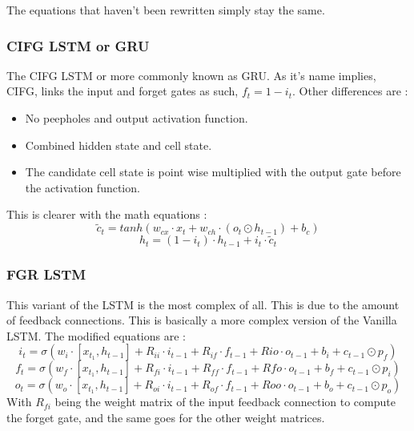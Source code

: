 The equations that haven't been rewritten simply stay the same.

\subsubsection{\acf{CIFG} \ac{LSTM} or \acf{GRU}}
The \ac{CIFG} \ac{LSTM} or more commonly known as \ac{GRU}. \cite{gru,gruKeras,gruPyTorch} As it's name implies, \acl{CIFG}, links the input and forget gates as such, $f_t=1-i_t$. Other differences are :
\begin{itemize}
  \item No peepholes and output activation function.
  \item Combined hidden state and cell state.
  \item The candidate cell state is point wise multiplied with the output gate before the activation function.
\end{itemize}

This is clearer with the math equations :
\begin{equation}\label{eq:cellGGRU}
  \tilde{c}_t = tanh(w_{cx}\cdot x_t + w_{ch}\cdot(o_t \odot h_{t-1}) + b_c)
\end{equation}
\begin{equation}\label{eq:hiddenGRU}
  h_t=(1-i_t)\cdot h_{t-1} + i_t \cdot \tilde{c}_t
\end{equation}

\subsubsection{\acf{FGR} \ac{LSTM}}
This variant of the \ac{LSTM} is the most complex of all. This is due to the amount of feedback connections. This is basically a more complex version of the Vanilla \ac{LSTM}. The modified equations are :
\begin{equation}\label{eq:inputGFGR}
  i_t=\sigma (w_i\cdot[x_{t_1},h_{t-1}]+ R_{ii}\cdot i_{t-1} + R_{if}\cdot f_{t-1} + R{io}\cdot o_{t-1} + b_i+c_{t-1}\odot p_f)
\end{equation}
\begin{equation}\label{eq:forgetGFGR}
  f_t=\sigma (w_f\cdot[x_{t_1},h_{t-1}]+ R_{fi}\cdot i_{t-1} + R_{ff}\cdot f_{t-1} + R{fo}\cdot o_{t-1} + b_f+c_{t-1}\odot p_i)
\end{equation}
\begin{equation}\label{eq:ouputGFGR}
  o_t=\sigma (w_o\cdot[x_{t_1},h_{t-1}]+ R_{oi}\cdot i_{t-1} + R_{of}\cdot f_{t-1} + R{oo}\cdot o_{t-1} + b_o+c_{t-1}\odot p_o)
\end{equation}
With $R_{fi}$ being the weight matrix of the input feedback connection to compute the forget gate, and the same goes for the other weight matrices.

